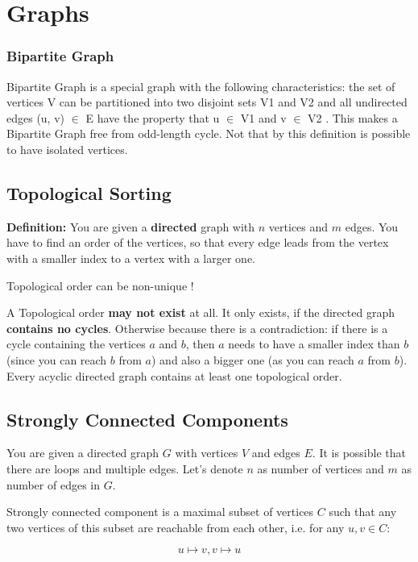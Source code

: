 \section{Graphs}

\subsubsection{Bipartite Graph}

Bipartite Graph is a special graph with the following characteristics: the set of vertices V can be partitioned into two disjoint sets V1 and V2 and all undirected edges (u, v) $\in$ E have the property that u $\in$ V1 and v $\in$ V2 . This makes a Bipartite Graph free from odd-length cycle.
Not that by this definition is possible to have isolated vertices.

\subsection{Topological Sorting}

\textbf{Definition:} You are given a \textbf{directed} graph with $n$ vertices and $m$ edges. You have to find an order of the vertices, so that every edge leads from the vertex with a smaller index to a vertex with a larger one.

Topological order can be non-unique !

A Topological order \textbf{may not exist} at all. It only exists, if the directed graph \textbf{contains no cycles}. Otherwise because there is a contradiction: if there is a cycle containing the vertices $a$ and $b$, then $a$ needs to have a smaller index than $b$ (since you can reach $b$ from $a$) and also a bigger one (as you can reach $a$ from $b$). Every acyclic directed graph contains at least one topological order.

\subsection{Strongly Connected Components}

You are given a directed graph $G$ with vertices $V$ and edges $E$. It is possible that there are loops and multiple edges. Let's denote $n$ as number of vertices and $m$ as number of edges in $G$.

Strongly connected component is a maximal subset of vertices
$C$ such that any two vertices of this subset are reachable from each other, i.e. for any $u, v \in C$:

$$u \mapsto v, v \mapsto u$$

